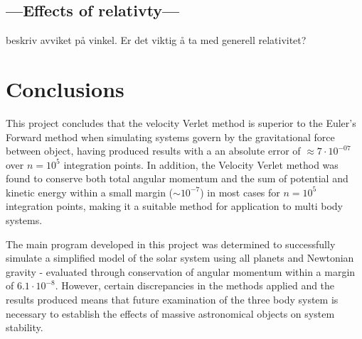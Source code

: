 \documentclass[%
oneside,                 %
final,                   %
10pt]{article}
\begin{document}
\subsection{---Effects of relativty---}
beskriv avviket på vinkel. Er det viktig å ta med generell relativitet?

\section{Conclusions}
This project concludes that the velocity Verlet method is superior to the Euler's Forward method when simulating systems govern by the gravitational force between object, having produced results with a an absolute error of $\approx 7 \cdot 10^{-07}$ over $n=10^5$ integration points. In addition, the Velocity Verlet method was found to conserve both total angular momentum and the sum of potential and kinetic energy within a small margin ($\sim 10^{-7}$) in most cases for $n=10^5$ integration points, making it a suitable method for application to multi body systems. \newline

The main program developed in this project was determined to successfully simulate a simplified model of  the solar system using all planets and Newtonian gravity - evaluated through conservation of angular momentum within a margin of $6.1 \cdot 10^{-8}$.  However, certain discrepancies in the methods applied and the results produced means that future examination of the three body system is necessary to establish the effects of massive astronomical objects on system stability.



\end{document}
